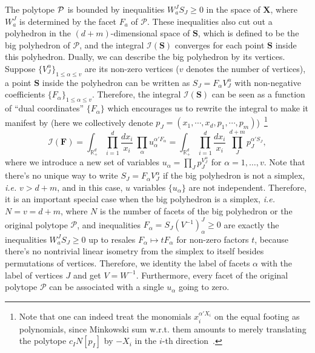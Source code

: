 \documentclass[hidelinks,12pt]{article}
\begin{document}
The polytope ${\cal P}$ is bounded by inequalities $W_a^JS_J\geq 0$ in the space of $\mathbf X$, where $W_a^J$ is determined by the facet $F_a$ of $\mathcal P$.  These inequalities also cut out a polyhedron in the $(d+m)$-dimensional space of $\mathbf S$, which is defined to be the big polyhedron of $\mathcal P$, 
and the integral $\mathcal I(\mathbf S)$ converges for each point $\mathbf S$ 
inside this polyhedron. Dually, we can describe the big polyhedron by its vertices. Suppose 
$\{V_J^\alpha\}_{1\leq \alpha \leq v}$ are its non-zero vertices ($v$ denotes the number of vertices), a point $\mathbf S$ inside 
the polyhedron can be written as $S_J = F_\alpha V^\alpha_J$ with non-negative coefficients 
$\{F_\alpha\}_{1\leq \alpha \leq v}$.  Therefore, the integral $\mathcal I(\mathbf S)$
can be seen as a function of ``dual coordinates'' $\{F_\alpha\}$ which encourages us to 
rewrite the integral to make it manifest by (here we collectively denote $p_J=(x_1, \cdots, x_d, p_1, \cdots, p_m)$)~\footnote{Note that one can indeed treat the monomials $x_i^{\alpha' X_i}$ on the equal footing as polynomials, since Minkowski sum w.r.t. them amounts to merely translating the polytope $c_I N[p_I]$ by $-X_i$ in the $i$-th direction~\cite{Arkani-Hamed:2019mrd}.}
\begin{equation}
	\mathcal I(\mathbf F)=
	\int_{\mathbb R_+^d} \prod_{i=1}^d \frac{d x_i}{x_i}~%
	\prod_{\alpha}u_\alpha^{\alpha' F_\alpha}
	=
	\int_{\mathbb R_+^d}\prod_{i=1}^d \frac{d x_i}{x_i}~%
	\prod_{J}^{d{+}m} p_J^{\alpha' S_J},
\end{equation}
where we introduce a new set of variables $u_\alpha = \prod_J p_J^{V_J^\alpha}$ for 
$\alpha=1,\dots, v$. Note that there's no unique way to write $S_J=F_\alpha V_J^\alpha$ if the big polyhedron is not a simplex, \textit{i.e.} $v>d+m$, and in this case,
$u$ variables $\{u_\alpha \}$ are not independent. Therefore, it is an important special case when the big polyhedron is a simplex, \textit{i.e.} $N=v=d+m$, where $N$ is 
the number of facets of the big polyhedron or the original polytope $\mathcal P$,
and inequalities $F_\alpha=S_J(V^{-1})^J_\alpha \geq 0$ are exactly the inequalities $W_a^J S_J\geq 0$ up to resales $F_\alpha \mapsto t F_\alpha$ for non-zero factors $t$, because
there's no nontrivial linear isometry from the simplex to itself besides permutations of vertices. Therefore, we identity the label of facets $\alpha$ with the label of 
vertices $J$ and get $V=W^{-1}$. Furthermore, every facet of the original polytope $\mathcal P$ can be associated with a single $u_\alpha$ going to zero. 
\end{document}
